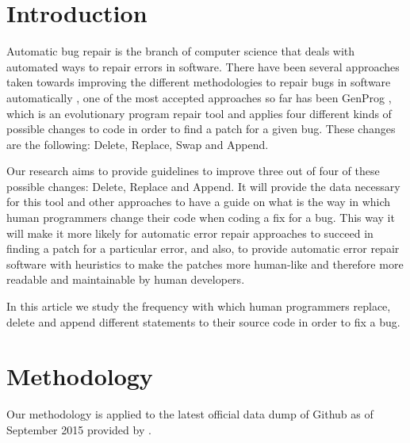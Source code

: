 \documentclass{sig-alternate-05-2015}
\begin{document}


\section{Introduction}
Automatic bug repair is the branch of computer science that deals with automated ways to repair errors in software. There have been several approaches taken towards improving the different methodologies to repair bugs in software automatically \cite{dongsun}\cite{weimer}\cite{claire} \cite{kai}, one of the most accepted approaches so far has been GenProg \cite{weimer}\cite{claire}, which is an evolutionary program repair tool and applies four different kinds of possible changes to code in order to find a patch for a given bug. These changes are the following: Delete, Replace, Swap and Append.

Our research aims to provide guidelines to improve three out of four of these possible changes: Delete, Replace and Append. It will provide the data necessary for this tool and other approaches to have a guide on what is the way in which human programmers change their code when coding a fix for a bug. This way it will make it more likely for automatic error repair approaches to succeed in finding a patch for a particular error, and also, to provide automatic error repair software with heuristics to make the patches more human-like and therefore more readable and maintainable by human developers.

In this article we study the frequency with which human programmers replace, delete and append different statements to their source code in order to fix a bug.


\section{Methodology}
Our methodology is applied to the latest official data dump of Github as of September 2015 provided by \cite{robert}.
\end{document}
